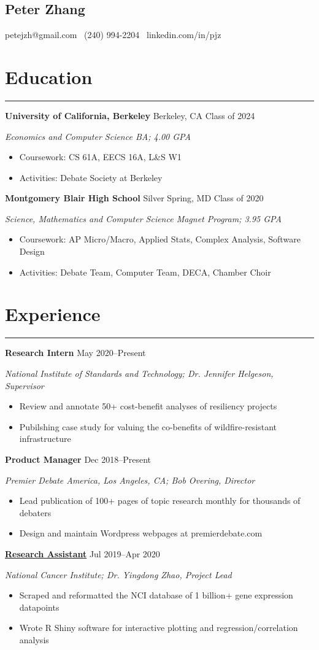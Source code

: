 \documentclass[11pt]{article}
\newcommand{\name}[1]{\begin{center}\section*{\huge \color{highlight} #1}\end{center}}
\newcommand{\topinfo}[1]{\begin{center}\vspace{-0.2cm}#1\vspace{-0.2cm}\end{center}}
\newcommand{\resumesection}[1]{\vspace{-0.3cm}\section*{\color{highlight}#1}\vspace{-0.3cm}\hrule\vspace{0.3cm}}
\begin{document}
\name{Peter Zhang}
\topinfo{petejzh@gmail.com \textbullet\ (240) 994-2204 \textbullet\ linkedin.com/in/pjz}

\resumesection{Education}

\textbf{University of California, Berkeley} Berkeley, CA \hfill Class of 2024 \par
\textit{Economics and Computer Science BA; 4.00 GPA}
\begin{itemize}
	\item Coursework: CS 61A, EECS 16A, L\&S W1
	\item Activities: Debate Society at Berkeley
\end{itemize}

\textbf{Montgomery Blair High School} Silver Spring, MD \hfill Class of 2020 \par
\textit{Science, Mathematics and Computer Science Magnet Program; 3.95 GPA}

\begin{itemize}
	\item Coursework: AP Micro/Macro, Applied Stats, Complex Analysis, Software Design
	\item Activities: Debate Team, Computer Team, DECA, Chamber Choir
\end{itemize}

\resumesection{Experience}

\textbf{Research Intern} \hfill May 2020--Present \par
\textit{National Institute of Standards and Technology; Dr. Jennifer Helgeson, Supervisor}
\begin{itemize}
	\item Review and annotate 50+ cost-benefit analyses of resiliency projects
	\item Pubilshing case study for valuing the co-benefits of wildfire-resistant infrastructure
\end{itemize}\vspace{0.1cm}

\textbf{Product Manager} \hfill Dec 2018--Present \par
\textit{Premier Debate America, Los Angeles, CA; Bob Overing, Director}
\begin{itemize}
	\item Lead publication of 100+ pages of topic research monthly for thousands of debaters
	\item Design and maintain Wordpress webpages at premierdebate.com
\end{itemize}

\textbf{\href{https://github.com/petezh/TP-Workbench}{Research Assistant}} \hfill Jul 2019--Apr 2020 \par
\textit{National Cancer Institute; Dr. Yingdong Zhao, Project Lead}
\begin{itemize}
	\item Scraped and reformatted the NCI database of 1 billion+ gene expression datapoints
	\item Wrote R Shiny software for interactive plotting and regression/correlation analysis
\end{itemize}\vspace{0.1cm}
\end{document}
